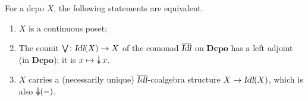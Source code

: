 \documentclass{LMCS}
\newif\ifignore \ignorefalse
\newcommand{\auxproof}[1]{
\ifignore\mbox{}\newline
\textbf{PROOF:} \dotfill\newline
{\it #1}\mbox{}\newline
\textbf{ENDPROOF}\dotfill
\fi}
\newcommand{\Cat}[1]{\ensuremath{\mathbf{#1}}}
\newcommand{\idmap}[1][]{\ensuremath{\mathrm{id}_{#1}}}
\newcommand{\Idl}{\textsl{Idl}\xspace}
\newcommand{\Dcpo}{\Cat{Dcpo}\xspace}
\newcommand{\set}[2]{\{#1\;|\;#2\}}
\newcommand{\exin}[3]{\exists{#1\in#2}.\,#3}
\newcommand{\downset}{\mathop{\downarrow}\!}
\def\ddownset{\mathop{\rlap{$\downarrow$}\raisebox{.4ex}{$\downarrow$}}}
\begin{document}
For a dcpo $X$, the following statements are equivalent.
\begin{enumerate}[(1)]
\item $X$ is a continuous poset;

\item The counit $\bigvee\colon\Idl(X)\rightarrow X$ of the comonad
  $\overline{\Idl}$ on \Dcpo has a left adjoint (in \Dcpo); it is
  $x\mapsto \ddownset x$.

\item $X$ carries a (necessarily unique) $\overline{\Idl}$-coalgebra
  structure $X \rightarrow \Idl(X)$, which is also
  $\ddownset(-)$. 
\end{enumerate}





\auxproof{
We shall prove the equivalence of the first two points. In one
direction, if $X$ is a continuous dcpo, then $\ddownset\colon X
\rightarrow \Idl(X)$ is a continuous function: for a directed subset
$U\subseteq X$ one has:
$$\begin{array}{rcccccl}
y\in \ddownset U
& \Longleftrightarrow &
y \ll \bigvee U 
& \smash{\stackrel{(*)}{\Longleftrightarrow}} &
\exin{x}{U}{y\ll x}
& \Longleftrightarrow &
y\in \bigcup\set{\ddownset x}{x\in U}.
\end{array}$$

\noindent The implication $\smash{\stackrel{(*)}{\Longleftarrow}}$ is
obvious; for $\smash{\stackrel{(*)}{\Longrightarrow}}$, assume $y\ll
\bigvee U$; then by interpolation (Lemma~\ref{InterpolationLem}, with
$f = \idmap$), there is a $z$ with $y \ll z \ll \bigvee U$. But then
$z \leq x$ for some $x \in U$ and thus $y\ll x$. Next we have to
prove the adjoint correspondence:
$$\begin{prooftree}
\ddownset x \;\subseteq\; U
\Justifies
x \;\leq\; \textstyle \bigvee U
\end{prooftree}$$

\noindent where $U\in\Idl(X)$. For the downward direction, if
$\ddownset x \subseteq U$, then $x = \bigvee\ddownset x \leq \bigvee
U$. Upwards: if $x\leq\bigvee$ and $y\in\ddownset x$, then $y\ll x$
and so $y\leq z$ for some $z\in U$. But then $y\in U$ since $U$ is a
downset.

Now assume the existence of a left adjoint $c\dashv \bigvee$ in \Dcpo.
Hence $c$ is a continuous function $c\colon X\rightarrow \Idl(X)$ with
$c(x)\subseteq U \Leftrightarrow x\leq \bigvee U$, for
$U\in\Idl(X)$. We then have $\bigvee c(x) = x$, since in one
direction, $c(x)\subseteq c(x)$ yields $x\leq \bigvee c(x)$. And
conversely, from $x\leq \bigvee\downset x$ we get $c(x)\subseteq
\downset x$, and so $\bigvee c(x) \leq \bigvee\downset x = x$.

}
\end{document}

